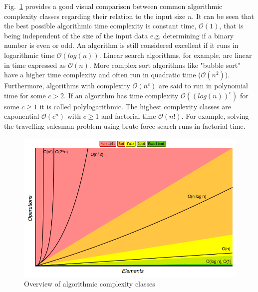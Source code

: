 Fig.~\ref{fig:algcomplexities} provides a good visual comparison between common algorithmic complexity classes regarding their relation to the input size $n$. It can be seen that the best possible algorithmic time complexity is constant time, $\mathcal{O}(1)$, that is being independent of the size of the input data e.g. determining if a binary number is even or odd. An algorithm is still considered excellent if it runs in logarithmic time $\mathcal{O}(log(n))$. Linear search algorithms, for example, are linear in time expressed as $\mathcal{O}(n)$. More complex sort algorithms like "bubble sort" have a higher time complexity and often run in quadratic time ($\mathcal{O}(n^2)$). Furthermore, algorithms with complexity $\mathcal{O}(n^c)$ are said to run in polynomial time for some $c > 2$. If an algorithm has time complexity $\mathcal{O}((log(n))^c)$ for some $c \geq 1$ it is called polylogarithmic. The highest complexity classes are exponential $\mathcal{O}(c^n)$ with $c \geq 1$ and factorial time $\mathcal{O}(n!)$. For example, solving the travelling salesman problem using brute-force search runs in factorial time.

\begin{figure}[H]
      \centering
       \includegraphics[scale=0.35]{img/bigocomplexity.png}
       \caption[]{\label{fig:algcomplexities} Overview of algorithmic complexity classes\footnotemark[6]}
\end{figure}
